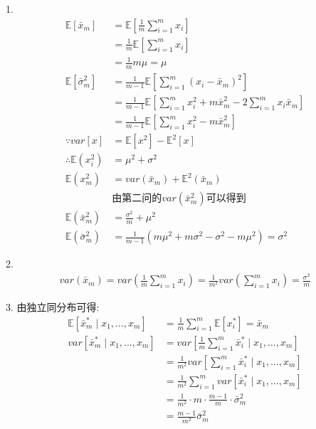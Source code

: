\documentclass[answers]{exam}  %
\begin{document}
\begin{questions}
    \begin{solution}
        1.
        \begin{align*}
            \mathbb E[\bar{x}_m]        & =\mathbb E[\frac{1}{m} \sum_{i=1}^{m}x_i]                  \\&=\frac{1}{m} \mathbb E[\sum_{i=1}^{m}x_i]\\&=\frac{1}{m} m\mu=\mu\\
            \mathbb E[\bar{\sigma}^2_m] & =\frac{1}{m-1} \mathbb E[\sum_{i=1}^{m}(x_i-\bar{x}_m)^2]  \\&=\frac{1}{m-1} \mathbb E[\sum_{i=1}^{m}x_i^2+m\bar{x}_m^2-2\sum_{i=1}^{m}x_i\bar{x}_m]\\&=\frac{1}{m-1}\mathbb E[\sum_{i=1}^{m}x_i^2-m\bar{x}_m^2]\\
            \because var[x]             & =\mathbb E[x^2]-\mathbb E^2[x]                             \\
            \therefore \mathbb E(x_i^2) & =\mu^2+\sigma^2                                            \\
            \mathbb E(x_m^2)            & =var(\bar{x}_m)+\mathbb E^2(\bar{x}_m)                     \\
                                        & \text{由第二问的$var(\bar{x}_m^2)$可以得到}                \\
            \mathbb E(\bar{x}_m^2)      & =\frac{\sigma^2}{m} +\mu^2                                 \\
            \mathbb E(\bar{\sigma}_m^2) & =\frac{1}{m-1} (m\mu^2+m\sigma^2-\sigma^2-m\mu^2)=\sigma^2
        \end{align*}

        2.
        \begin{align*}
            var(\bar{x}_m)=var(\frac{1}{m} \sum_{i=1}^{m}x_i)=\frac{1}{m^2} var(\sum_{i=1}^{m}x_i)=\frac{\sigma^2}{m}
        \end{align*}

        3.
        由独立同分布可得:
        \begin{align*}
            \mathbb E[\bar{x}^*_m \mid x_1, \ldots, x_m] & =\frac{1}{m} \sum_{i=1}^{m}\mathbb E[x_i^*]=\bar{x}_m              \\
            var[\bar{x}^*_m \mid x_1, \ldots, x_m]       & = var[\frac{1}{m} \sum_{i=1}^{m}\bar{x}^*_i \mid x_1, \ldots, x_m] \\&=\frac{1}{m^2}var[\sum_{i=1}^{m}\bar{x}^*_i \mid x_1, \ldots, x_m] \\&
            =\frac{1}{m^2} \sum_{i=1}^{m}var[\bar{x}^*_i \mid x_1, \ldots, x_m]                                               \\&=\frac{1}{m^2} \cdot m\cdot \frac{m-1}{m} \cdot \bar{\sigma}_m^2\\&=\frac{m-1}{m^2} \bar{\sigma}_m^2
        \end{align*}


\end{solution}
\end{questions}
\end{document}
